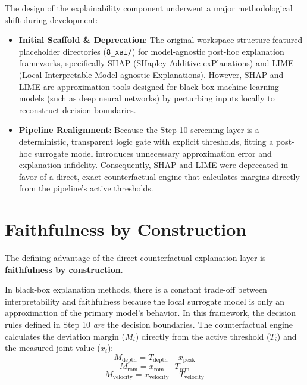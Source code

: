 The design of the explainability component underwent a major methodological shift during development:
\begin{itemize}
  \item \textbf{Initial Scaffold \& Deprecation}: The original workspace structure featured placeholder directories (\texttt{8\_xai/}) for model-agnostic post-hoc explanation frameworks, specifically SHAP (SHapley Additive exPlanations) and LIME (Local Interpretable Model-agnostic Explanations). However, SHAP and LIME are approximation tools designed for black-box machine learning models (such as deep neural networks) by perturbing inputs locally to reconstruct decision boundaries.
  \item \textbf{Pipeline Realignment}: Because the Step 10 screening layer is a deterministic, transparent logic gate with explicit thresholds, fitting a post-hoc surrogate model introduces unnecessary approximation error and explanation infidelity. Consequently, SHAP and LIME were deprecated in favor of a direct, exact counterfactual engine that calculates margins directly from the pipeline's active thresholds.
\end{itemize}



\section{Faithfulness by Construction}
\label{sec:12-3-faithfulness-by-construction}


The defining advantage of the direct counterfactual explanation layer is \textbf{faithfulness by construction}.

In black-box explanation methods, there is a constant trade-off between interpretability and faithfulness because the local surrogate model is only an approximation of the primary model's behavior. In this framework, the decision rules defined in Step 10 \textit{are} the decision boundaries. The counterfactual engine calculates the deviation margin ($M_i$) directly from the active threshold ($T_i$) and the measured joint value ($x_i$):
\begin{equation}
  M_{\text{depth}} = T_{\text{depth}} - x_{\text{peak}}
  \label{eq:disp1}
\end{equation}
\begin{equation}
  M_{\text{rom}} = x_{\text{rom}} - T_{\text{rom}}
  \label{eq:disp2}
\end{equation}
\begin{equation}
  M_{\text{velocity}} = x_{\text{velocity}} - T_{\text{velocity}}
  \label{eq:disp3}
\end{equation}

